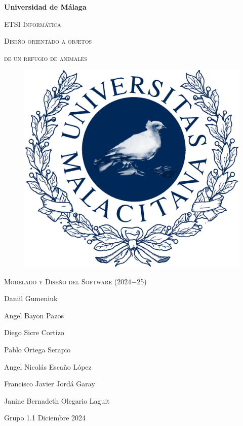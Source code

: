 \documentclass[12pt, a4paper, titlepage]{article}
\begin{document}
\begin{titlepage}
  \centering
  {\bfseries\LARGE Universidad de Málaga\par}
  \vspace{1cm}
  {\scshape\Large ETSI Informática\par}
  \vspace{2cm}
  {\scshape\Huge Diseño orientado a objetos\par}
  \vspace{0.1cm}
  {\scshape\Huge de un refugio de animales}
  \vspace{2cm}
  \begin{figure}[H]
      \centering
       \includegraphics[width=0.30\linewidth]{assets/umaLogo.png}
  \end{figure}
  \vfill
  {\scshape\Large Modelado y Diseño del Software (2024$-$25)\par}
  \vspace{0.5cm}
  {\Large Daniil Gumeniuk\par}
  {\Large Angel Bayon Pazos \par}
  {\Large Diego Sicre Cortizo\par}
  {\Large Pablo Ortega Serapio\par}
  {\Large Angel Nicolás Escaño López\par}
  {\Large Francisco Javier Jordá Garay\par}
  {\Large Janine Bernadeth Olegario Laguit\par}
  \vspace{1cm}
  {\Large Grupo 1.1}
  \vfill
  {\Large Diciembre 2024}
  
  \end{titlepage}

\tableofcontents %
\thispagestyle{empty} %

\newpage

\listoffigures %
\thispagestyle{empty}
\end{document}
